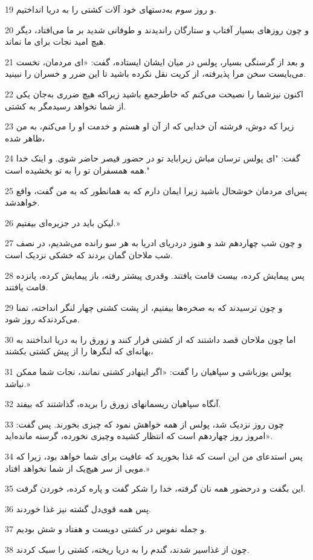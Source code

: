 \par 19 و روز سوم به‌دستهای خود آلات کشتی را به دریا انداختیم.
\par 20 و چون روزهای بسیار آفتاب و ستارگان راندیدند و طوفانی شدید بر ما می‌افتاد، دیگر هیچ امید نجات برای ما نماند.
\par 21 و بعد از گرسنگی بسیار، پولس در میان ایشان ایستاده، گفت: «ای مردمان، نخست می‌بایست سخن مرا پذیرفته، از کریت نقل نکرده باشید تا این ضرر و خسران را نبینید.
\par 22 اکنون نیزشما را نصیحت می‌کنم که خاطرجمع باشید زیراکه هیچ ضرری به‌جان یکی از شما نخواهد رسیدمگر به کشتی.
\par 23 زیرا که دوش، فرشته آن خدایی که از آن او هستم و خدمت او را می‌کنم، به من ظاهر شده،
\par 24 گفت: "ای پولس ترسان مباش زیراباید تو در حضور قیصر حاضر شوی. و اینک خدا همه همسفران تو را به تو بخشیده است."
\par 25 پس‌ای مردمان خوشحال باشید زیرا ایمان دارم که به همانطور که به من گفت، واقع خواهدشد.
\par 26 لیکن باید در جزیره‌ای بیفتیم.»
\par 27 و چون شب چهاردهم شد و هنوز دردریای ادریا به هر سو رانده می‌شدیم، در نصف شب ملاحان گمان بردند که خشکی نزدیک است.
\par 28 پس پیمایش کرده، بیست قامت یافتند. وقدری پیشتر رفته، باز پیمایش کرده، پانزده قامت یافتند.
\par 29 و چون ترسیدند که به صخره‌ها بیفتیم، از پشت کشتی چهار لنگر انداخته، تمنا می‌کردندکه روز شود.
\par 30 اما چون ملاحان قصد داشتند که از کشتی فرار کنند و زورق را به دریا انداختند به بهانه‌ای که لنگرها را از پیش کشتی بکشند،
\par 31 پولس یوزباشی و سپاهیان را گفت: «اگر اینهادر کشتی نمانند، نجات شما ممکن نباشد.»
\par 32 آنگاه سپاهیان ریسمانهای زورق را بریده، گذاشتند که بیفتد.
\par 33 چون روز نزدیک شد، پولس از همه خواهش نمود که چیزی بخورند. پس گفت: «امروز روز چهاردهم است که انتظار کشیده وچیزی نخورده، گرسنه مانده‌اید.
\par 34 پس استدعای من این است که غذا بخورید که عافیت برای شما خواهد بود، زیرا که مویی از سر هیچ‌یک از شما نخواهد افتاد.»
\par 35 این بگفت و درحضور همه نان گرفته، خدا را شکر گفت و پاره کرده، خوردن گرفت.
\par 36 پس همه قوی‌دل گشته نیز غذا خوردند.
\par 37 و جمله نفوس در کشتی دویست و هفتاد و شش بودیم.
\par 38 چون از غذاسیر شدند، گندم را به دریا ریخته، کشتی را سبک کردند.
